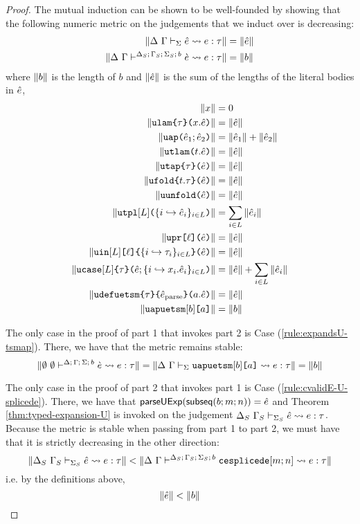 \begin{proof}
The mutual induction can be shown to be well-founded by showing that the following numeric metric on the judgements that we induct over is decreasing:
\begin{align*}
\Vert \Delta~\Gamma \vdash_{\Sigma} \hat{e} \leadsto e : \tau \Vert & = \Vert \hat{e} \Vert\\
\Vert \Delta~\Gamma\vdash^{\Delta_S;\,\Gamma_S;\,\Sigma_S;\,b} \grave{e} \leadsto e : \tau \Vert & = \Vert b \Vert
\end{align*}
where $\Vert b \Vert$ is the length of $b$ and $\Vert \hat{e} \Vert$ is the sum of the lengths of the literal bodies in $\hat{e}$,
\begin{align*}
\Vert x \Vert & = 0\\
\Vert \texttt{ulam}\texttt{\{}\tau\texttt{\}(}x.\hat{e}\texttt{)} \Vert &= \Vert \hat{e} \Vert\\
\Vert \texttt{uap}\texttt{(}\hat{e}_1; \hat{e}_2\texttt{)} \Vert & = \Vert \hat{e}_1 \Vert + \Vert \hat{e}_2 \Vert\\
\Vert \texttt{utlam}\texttt{(}t.\hat{e}\texttt{)} \Vert & = \Vert \hat{e} \Vert\\
\Vert \texttt{utap}\texttt{\{}\tau\texttt{\}(}\hat{e}\texttt{)} \Vert & = \Vert \hat{e} \Vert\\
\Vert \texttt{ufold}\texttt{\{}t.\tau\texttt{\}(}\hat{e}\texttt{)} \Vert & = \Vert \hat{e} \Vert\\
\Vert \texttt{uunfold}\texttt{(}\hat{e}\texttt{)} \Vert & = \Vert \hat{e} \Vert\\
\Vert \texttt{utpl}[L]\texttt{(}\{i \hookrightarrow \hat{e}_{i}\}_{i \in L}\texttt{)} \Vert & = \sum_{i \in L} \Vert \hat{e}_i \Vert\\
\Vert \texttt{upr}\texttt{[}\ell\texttt{](}\hat{e}\texttt{)} \Vert & = \Vert \hat{e} \Vert\\
\Vert \texttt{uin}[L]\texttt{[}\ell\texttt{]\{}\{i \hookrightarrow \tau_{i}\}_{i \in L}\texttt{\}(}\hat{e}\texttt{)} \Vert & = \Vert \hat{e} \Vert\\
\Vert \texttt{ucase}[L]\texttt{\{}\tau\texttt{\}(}\hat{e}; \{i \hookrightarrow x_{i}.\hat{e}_{i}\}_{i \in L}\texttt{)} \Vert & = \Vert \hat{e} \Vert + \sum_{i \in L} \Vert \hat{e}_i \Vert\\
\Vert \texttt{udefuetsm}\texttt{\{}\tau\texttt{\}\{}\hat{e}_\text{parse}\texttt{\}(}a.\hat{e}\texttt{)} \Vert & = \Vert \hat{e} \Vert\\
\Vert \texttt{uapuetsm}[b]\texttt{[}a\texttt{]} \Vert & = \Vert b \Vert
\end{align*}

The only case in the proof of part 1 that invokes part 2 is Case (\ref{rule:expandsU-tsmap}). There, we have that the metric remains stable: \[\Vert \emptyset~\emptyset\vdash^{\Delta;\,\Gamma;\,\Sigma;\,b} \grave{e} \leadsto e : \tau \Vert = \Vert \Delta~\Gamma \vdash_{\Sigma} \texttt{uapuetsm}[b]\texttt{[}a\texttt{]} \leadsto e : \tau \Vert=\Vert b \Vert\]

The only case in the proof of part 2 that invokes part 1 is Case (\ref{rule:cvalidE-U-splicede}). There, we have that $\mathsf{parseUExp}(\mathsf{subseq}(b; m; n))=\hat{e}$ and Theorem \ref{thm:typed-expansion-U} is invoked on the judgement $\Delta_S~\Gamma_S \vdash_{\Sigma_S} \hat{e} \leadsto e : \tau$. Because the metric is stable when passing from part 1 to part 2, we must have that it is strictly decreasing in the other direction:
\[\Vert \Delta_S~\Gamma_S \vdash_{\Sigma_S} \hat{e} \leadsto e : \tau \Vert < \Vert \Delta~\Gamma\vdash^{\Delta_S;\,\Gamma_S;\,\Sigma_S;\,b} \texttt{cesplicede}[m; n] \leadsto e : \tau \Vert\]
i.e. by the definitions above, 
\[\Vert \hat{e} \Vert < \Vert b \Vert\]


\end{proof}
